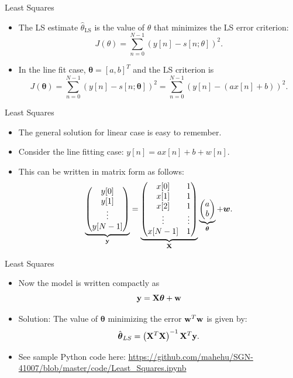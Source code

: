 \documentclass[10pt, aspectratio=169]{beamer} %
\newcommand{\su}{{\sum_{n=0}^{N-1}}}
\newcommand{\thb}{\boldsymbol{\theta}}
\newcommand{\w}{{\bf w}}
\newcommand{\X}{{\bf X}}
\newcommand{\y}{{\bf y}}
\begin{document}
\begin{frame}[allowframebreaks=0.8]
 {Least Squares}
 \begin{itemize}
\item The LS estimate $\hat{\theta}_{\text{LS}}$ is the value of $\theta$
that minimizes the LS error criterion:
\[
 J(\theta) = \su (y[n]-s[n;\theta])^2.
\]
\item In the line fit case, $\thb = [a, b]^T$ and the LS criterion is
\[
 J(\thb) = \su (y[n]-s[n;\thb])^2 = \su (y[n]-(ax[n]+b))^2.
\]
\end{itemize}
\end{frame}

\begin{frame}[allowframebreaks=0.8]
 {Least Squares}
 \begin{itemize}

\item The general solution for linear case is easy to remember.
\item Consider the line fitting case:
\(
y[n] = ax[n] + b + w[n].
\)
\item This can be written in matrix form as follows:
\[
\underbrace{\begin{pmatrix}
y[0]\\y[1]\\ \vdots\\y[N-1]
\end{pmatrix}}_{\y}
 = 
\underbrace{
\begin{pmatrix}
x[0] & 1\\
x[1] & 1\\
x[2] & 1\\
\vdots & \vdots\\
x[N-1] & 1
\end{pmatrix}}_{\X}
\underbrace{
\begin{pmatrix}a\\b\end{pmatrix}}_{\thb}
 + \boldsymbol{w}.
\]
\end{itemize}
\end{frame}


\begin{frame}[allowframebreaks=0.8]
 {Least Squares}
 \begin{itemize}
\item Now the model is written compactly as
\[
\y = \X\thb + \w
\]

\item Solution: The value of $\thb$ minimizing the error $\w^T\w$ is given by:
\[
\hat{\thb}_{LS} = \left(\X^T\X\right)^{-1}\X^T\y.
\]
\item See sample Python code here:
\url{https://github.com/mahehu/SGN-41007/blob/master/code/Least_Squares.ipynb}

\end{itemize}

\end{frame}
\end{document}
